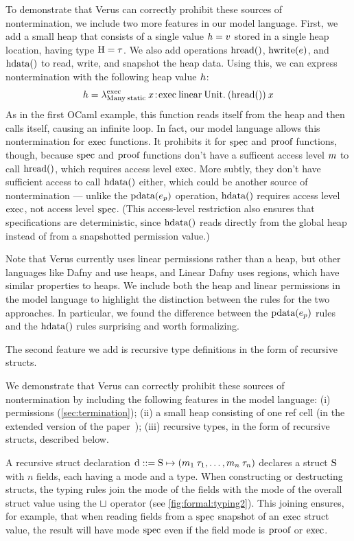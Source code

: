 \ifextended
To demonstrate that Verus can correctly prohibit these sources of nontermination,
we include two more features in our model language.
First, we add a small heap that consists of a single value $h = v$
stored in a single heap location, having type $\textrm{H} = \tau$.
We also add operations $\textrm{hread}()$, $\textrm{hwrite}(e)$, and $\textrm{hdata}()$
to read, write, and snapshot the heap data.
Using this, we can express nontermination with the following heap value $h$:
\[
h =
  \lambda^{\textrm{exec}}_{\textrm{Many}\: \textrm{static}}\:x\!:\! \textrm{exec}\: \textrm{linear}\: \textrm{Unit}.\: (\textrm{hread}())\: x
\]
As in the first OCaml example, this function reads itself from the heap
and then calls itself, causing an infinite loop.
In fact, our model language allows this nontermination for $\textrm{exec}$ functions.
It prohibits it for $\textrm{spec}$ and $\textrm{proof}$ functions,
though, because $\textrm{spec}$ and $\textrm{proof}$ functions don't have a sufficent access level $m$
to call $\textrm{hread}()$, which requires access level $\textrm{exec}$.
More subtly, they don't have sufficient access to call $\textrm{hdata}()$ either,
which could be another source of nontermination ---
unlike the $\textrm{pdata}(e_p)$ operation, $\textrm{hdata}()$ requires access level $\textrm{exec}$,
not access level $\textrm{spec}$.
(This access-level restriction also ensures that specifications are deterministic,
since $\textrm{hdata}()$ reads directly from the global heap instead of from a snapshotted permission value.)

Note that Verus currently uses linear permissions rather than a heap,
but other languages like Dafny and \fstar use heaps,
and Linear Dafny uses regions, which have similar properties to heaps.
We include both the heap and linear permissions in the model language
to highlight the distinction between the rules for the two approaches.
In particular, we found the difference between
the $\textrm{pdata}(e_p)$ rules and the $\textrm{hdata}()$ rules surprising and worth formalizing.

The second feature we add is recursive type definitions
in the form of recursive structs.
\else

We demonstrate that Verus can correctly prohibit these sources of nontermination by including
the following features in the model language:
(i) permissions (\autoref{sec:termination});
(ii) a small heap consisting of one ref cell
(in the extended version of the paper~\cite{verus2023extended});
(iii) recursive types, in the form of recursive structs, described below.

\fi
A recursive struct declaration
$\textrm{d} ::= \textrm{S}\mapsto(m_1\:\tau_1,\ldots,m_n\:\tau_n)$
declares a struct $\textrm{S}$ with $n$ fields,
each having a mode and a type.
When constructing or destructing structs,
the typing rules join the mode of the fields with the mode of the overall struct value
using the $\sqcup$ operator (see \autoref{fig:formal:typing2}).
This joining ensures, for example, that when reading fields from a $\textrm{spec}$ snapshot
of an $\textrm{exec}$ struct value, the result will have mode $\textrm{spec}$ even if the field mode
is $\textrm{proof}$ or $\textrm{exec}$.

